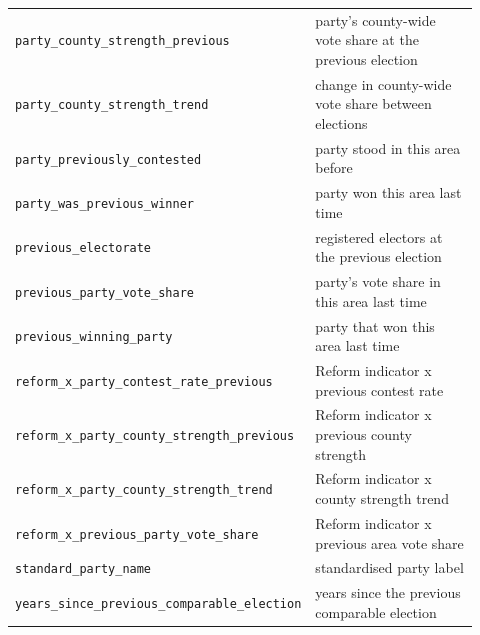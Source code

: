\begin{tabular}{p{0.42\linewidth}p{0.50\linewidth}}
\texttt{party\_county\_strength\_previous} & party's county-wide vote share at the previous election \\
\texttt{party\_county\_strength\_trend} & change in county-wide vote share between elections \\
\texttt{party\_previously\_contested} & party stood in this area before \\
\texttt{party\_was\_previous\_winner} & party won this area last time \\
\texttt{previous\_electorate} & registered electors at the previous election \\
\texttt{previous\_party\_vote\_share} & party's vote share in this area last time \\
\texttt{previous\_winning\_party} & party that won this area last time \\
\texttt{reform\_x\_party\_contest\_rate\_previous} & Reform indicator x previous contest rate \\
\texttt{reform\_x\_party\_county\_strength\_previous} & Reform indicator x previous county strength \\
\texttt{reform\_x\_party\_county\_strength\_trend} & Reform indicator x county strength trend \\
\texttt{reform\_x\_previous\_party\_vote\_share} & Reform indicator x previous area vote share \\
\texttt{standard\_party\_name} & standardised party label \\
\texttt{years\_since\_previous\_comparable\_election} & years since the previous comparable election \\
\bottomrule
\end{tabular}

